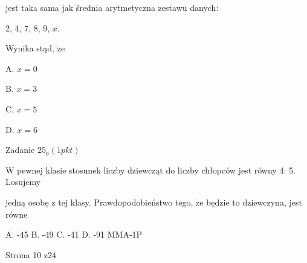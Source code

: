 \documentclass[a4paper,12pt]{article}
\begin{document}
jest taka sama jak średnia arytmetyczna zestawu danych:

2, 4, 7, 8, 9, $x.$

Wynika stąd, $\dot{\mathrm{z}}\mathrm{e}$

A. $x=0$

B. $x=3$

C. $x=5$

D. $x=6$

Zadanie $25_{\mathfrak{v}}(1pkt)$

$\mathrm{W}$ pewnej klasie stosunek liczby dziewcząt do liczby chłopców jest równy 4: 5. Losujemy

jedną osobę z tej klasy. Prawdopodobieństwo tego, $\dot{\mathrm{z}}\mathrm{e}$ będzie to dziewczyna, jest równe

A. -45 B. -49 C. -41 D. -91 MMA-1P

Strona 10 $\mathrm{z}24$
\end{document}
